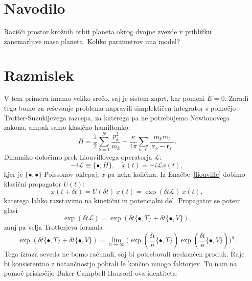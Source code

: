 \documentclass[12pt, a4paper]{article}
\renewcommand{\r}{
    \ensuremath{\mathbf{r}}
}
\renewcommand{\L}{
    \ensuremath{\mathcal{L}}
}
\newcommand{\sfrac}[2]{
    \ensuremath{\textstyle{\frac{#1}{#2}}}
}
\begin{document}
\section{Navodilo}

Razi\v s\v ci prostor kro\v znih orbit planeta okrog dvojne zvezde v pribli\v zku zanemarljive mase
planeta. Koliko parametrov ima model?

\section{Razmislek}

V tem primeru imamo veliko sre\v co, saj je sistem zaprt, kar pomeni $\dot{E} = 0$. Zaradi tega bomo
za re\v sevanje problema napravili simplekti\v cen integrator s pomo\v cjo Trotter-Suzukijevega
razcepa, za katerega pa ne potrebujemo Newtonovega zakona, ampak samo klasi\v cno hamiltonko:
\begin{equation}
    H = \frac{1}{2}\sum_{k = 1}^N \frac{p_k^2}{m_k} - \frac{\kappa}{4\pi}\sum_{k,\ell}
        \frac{m_k m_\ell}{|\r_k - \r_\ell|}.
    \label{hamilton}
\end{equation}
Dinamiko dolo\v cimo prek Liouvillovega operatorja $\L$:
\begin{equation}
    -i\L \equiv \{\bullet, H\}, \quad \dot{x}(t) = -i\L x(t),
    \label{liouville}
\end{equation}
kjer je $\{\bullet, \bullet\}$ Poissonov oklepaj, $x$ pa neka koli\v cina. Iz Ena\v cbe~\eqref{liouville}
dobimo klasi\v cni propagator $U(t)$:
\begin{equation}
    x(t + \delta t) = U(\delta t)\ x(t) = \exp(\delta t\L)\ x(t),
\end{equation}
katerega lahko razstavimo na kineti\v cni in potencialni del. Propagator se potem glasi
\begin{equation}
    \exp(\delta t \L) = \exp(\delta t \{\bullet, T\} + \delta t \{\bullet, V\}),
    \label{propagator}
\end{equation}
zanj pa velja Trotterjeva formula
\begin{equation}
    \exp(\delta t\{\bullet,T\} + \delta t\{\bullet,V\}) = \lim_{n \to \infty}
        \Big(\exp(\sfrac{\delta t}{n}\{\bullet,T\})\exp(\sfrac{\delta t}{n}\{\bullet,V\})\Big)^n.
\end{equation}
Tega izraza seveda ne bomo ra\v cunali, saj bi potrebovali neskon\v cen produk. Raje bi konsistentno z
natan\v cnostjo pobrali le kon\v cno mnogo faktorjev. Tu nam na pomo\v c prisko\v cijo
Baker-Campbell-Hausorff-ova identiteta:
\end{document}
